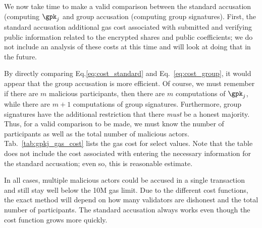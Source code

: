 We now take time to make a valid comparison between the
standard accusation (computing $\gpk_{j}$ and group accusation
(computing group signatures).
First, the standard accusation additional gas cost associated
with submitted and verifying public information related to the
encrypted shares and public coefficients;
we do not include an analysis of these costs at this time
and will look at doing that in the future.

By directly comparing Eq.\eqref{eq:cost_standard} and
Eq.~\eqref{eq:cost_group}, it would appear that the group accusation
is more efficient.
Of course, we must remember if there are $m$ malicious participants,
then there are $m$ computations of $\gpk_{j}$,
while there are $m+1$ computations of group signatures.
Furthermore, group signatures have the additional restriction that
there \emph{must} be a honest majority.
Thus, for a valid comparison to be made, we must know the
number of participants as well as the total number of malicious actors.
Tab.~\ref{tab:gpkj_gas_cost} lists the gas cost for select values.
Note that the table does not include the cost associated
with entering the necessary information for the standard accusation;
even so, this is reasonable estimate.



In all cases, multiple malicious actors could be accused
in a single transaction and still stay well below the 10M gas limit.
Due to the different cost functions, the exact method will depend
on how many validators are dishonest and the total number of participants.
The standard accusation always works even though the cost function
grows more quickly.




